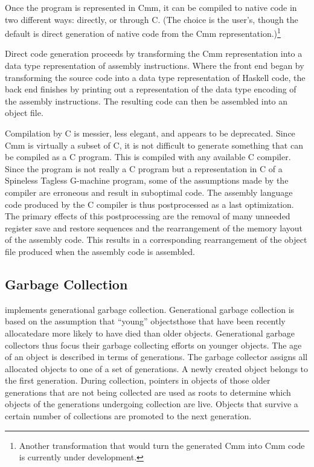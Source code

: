 Once the program is represented in Cmm, it can be compiled to native code in two different ways: directly, or through C. (The choice is the user's, though the default is direct generation of native code from the Cmm representation.)\footnote{Another transformation that would turn the generated Cmm into \CPS[long] Cmm code is currently under development.}

Direct code generation proceeds by transforming the Cmm representation into a data type representation of assembly instructions. Where the front end began by transforming the source code into a data type representation of Haskell code, the back end finishes by printing out a representation of the data type encoding of the assembly instructions. The resulting code can then be assembled into an object file.

Compilation by C is messier, less elegant, and appears to be deprecated. Since Cmm is virtually a subset of C, it is not difficult to generate something that can be compiled as a C program. This is compiled with any available C compiler. Since the program is not really a C program but a representation in C of a Spineless Tagless G-machine program, some of the assumptions made by the compiler are erroneous and result in suboptimal code. The assembly language code produced by the C compiler is thus postprocessed as a last optimization. The primary effects of this postprocessing are the removal of many unneeded register save and restore sequences and the rearrangement of the memory layout of the assembly code. This results in a corresponding rearrangement of the object file produced when the assembly code is assembled.

\subsection{Garbage Collection}
\GHC implements generational garbage collection. Generational garbage collection is based on the assumption that ``young'' objects\empause those that have been recently allocated\empause are more likely to have died than older objects. Generational garbage collectors thus focus their garbage collecting efforts on younger objects. The age of an object is described in terms of generations. The garbage collector assigns all allocated objects to one of a set of generations. A newly created object belongs to the first generation. During collection, pointers in objects of those older generations that are not being collected are used as roots to determine which objects of the generations undergoing collection are live. Objects that survive a certain number of collections are promoted to the next generation.

